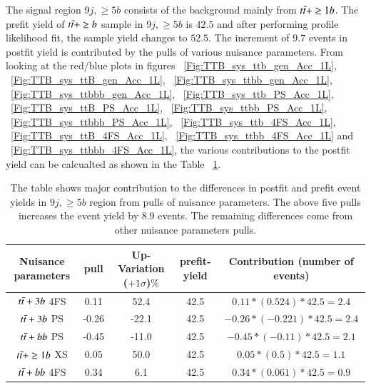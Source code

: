 The signal region $9j,\geq 5b$ consists of the background mainly from $t\Bar{t}+\geq 1b$. The prefit yield of $t\Bar{t}+\geq b $ sample in $9j,\geq5b$ is $42.5$ and after performing profile likelihood fit, the sample yield changes to $52.5$. The increment of $9.7$ events in postfit yield is contributed by the pulls of various nuisance parameters. From looking at the red/blue plots in figures ~\ref{Fig:TTB_sys_ttb_gen_Acc_1L}, ~\ref{Fig:TTB_sys_ttB_gen_Acc_1L}, ~\ref{Fig:TTB_sys_ttbb_gen_Acc_1L}, ~\ref{Fig:TTB_sys_ttbbb_gen_Acc_1L}, ~\ref{Fig:TTB_sys_ttb_PS_Acc_1L}, ~\ref{Fig:TTB_sys_ttB_PS_Acc_1L}, ~\ref{Fig:TTB_sys_ttbb_PS_Acc_1L}, ~\ref{Fig:TTB_sys_ttbbb_PS_Acc_1L}, ~\ref{Fig:TTB_sys_ttb_4FS_Acc_1L}, ~\ref{Fig:TTB_sys_ttB_4FS_Acc_1L}, ~\ref{Fig:TTB_sys_ttbb_4FS_Acc_1L} and ~\ref{Fig:TTB_sys_ttbbb_4FS_Acc_1L}, the various contributions to the postfit yield can be calcualted as shown in the Table ~\ref{tab:pulls_in_9jge5b}.

\begin{table}
  \begin{center}
    \begin{tabular}{|c|c|c|c|c|} 
      \hline
      Nuisance parameters & pull & Up-Variation ($+1\sigma$)$\%$ & prefit-yield & Contribution (number of events)\\
      \hline
      $t\Bar{t}+3b$ 4FS & 0.11 & 52.4 & 42.5 & $0.11*(0.524)*42.5=2.4$ \\
      $t\Bar{t}+3b$ PS & -0.26 & -22.1 & 42.5 & $-0.26*(-0.221)*42.5=2.4$ \\
      $t\Bar{t}+bb$ PS & -0.45 & -11.0 & 42.5 & $-0.45*(-0.11)*42.5=2.1$ \\
      $t\Bar{t}+\geq 1b$ XS & 0.05 & 50.0 & 42.5 & $0.05*(0.5)*42.5=1.1$ \\
      $t\Bar{t}+bb$ 4FS & 0.34 & 6.1 & 42.5 & $0.34*(0.061)*42.5=0.9$ \\
      \hline
    \end{tabular}
    \caption{The table shows major contribution to the differences in postfit and prefit event yields in $9j,\geq 5b$ region from pulls of nuisance parameters. The above five pulls increases the event yield by 8.9 events. The remaining differences come from other nuisance parameters pulls.}
    \label{tab:pulls_in_9jge5b}
  \end{center}
\end{table}


